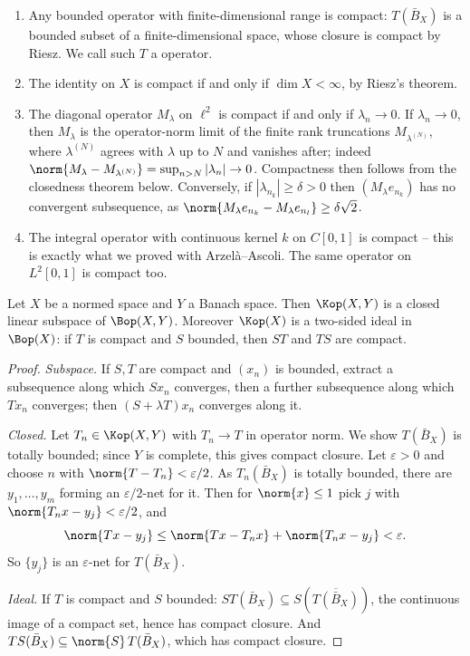\begin{example}
	\begin{enumerate}[label=(\roman*)]
		\item Any bounded operator with finite-dimensional range is compact: $T(\bar B_X)$ is a bounded subset of a finite-dimensional space, whose closure is compact by Riesz. We call such $T$ a  operator.
		\item The identity on $X$ is compact if and only if $\dim X<\infty$, by Riesz's theorem.
		\item The diagonal operator $M_\lambda$ on $\ell^2$ is compact if and only if $\lambda_n \to 0$. If $\lambda_n\to0$, then $M_\lambda$ is the operator-norm limit of the finite rank truncations $M_{\lambda^{(N)}}$, where $\lambda^{(N)}$ agrees with $\lambda$ up to $N$ and vanishes after; indeed $\norm{M_\lambda - M_{\lambda^{(N)}}} = \sup_{n>N}|\lambda_n|\to0$. Compactness then follows from the closedness theorem below. Conversely, if $|\lambda_{n_k}|\geq\delta>0$ then $(M_\lambda e_{n_k})$ has no convergent subsequence, as $\norm{M_\lambda e_{n_k}-M_\lambda e_{n_l}}\geq \delta\sqrt2$.
		\item The integral operator with continuous kernel $k$ on $C[0,1]$ is compact -- this is exactly what we proved with Arzelà--Ascoli. The same operator on $L^2[0,1]$ is compact too.
	\end{enumerate}
\end{example}

\begin{theorem}
	Let $X$ be a normed space and $Y$ a Banach space. Then $\Kop(X,Y)$ is a closed linear subspace of $\Bop(X,Y)$. Moreover $\Kop(X)$ is a two-sided ideal in $\Bop(X)$: if $T$ is compact and $S$ bounded, then $ST$ and $TS$ are compact.
\end{theorem}

\begin{proof}
	\emph{Subspace.} If $S,T$ are compact and $(x_n)$ is bounded, extract a subsequence along which $Sx_n$ converges, then a further subsequence along which $Tx_n$ converges; then $(S+\lambda T)x_n$ converges along it.

	\emph{Closed.} Let $T_n\in\Kop(X,Y)$ with $T_n\to T$ in operator norm. We show $T(\bar B_X)$ is totally bounded; since $Y$ is complete, this gives compact closure. Let $\varepsilon>0$ and choose $n$ with $\norm{T-T_n}<\varepsilon/2$. As $T_n(\bar B_X)$ is totally bounded, there are $y_1,\dots,y_m$ forming an $\varepsilon/2$-net for it. Then for $\norm{x}\leq1$ pick $j$ with $\norm{T_nx - y_j}<\varepsilon/2$, and
	$$\norm{Tx - y_j}\leq\norm{Tx-T_nx}+\norm{T_nx-y_j}<\varepsilon.$$
	So $\{y_j\}$ is an $\varepsilon$-net for $T(\bar B_X)$.

	\emph{Ideal.} If $T$ is compact and $S$ bounded: $ST(\bar B_X) \subseteq S(\overline{T(\bar B_X)})$, the continuous image of a compact set, hence has compact closure. And $TS(\bar B_X)\subseteq \norm{S}\, T(\bar B_X)$, which has compact closure.
\end{proof}

